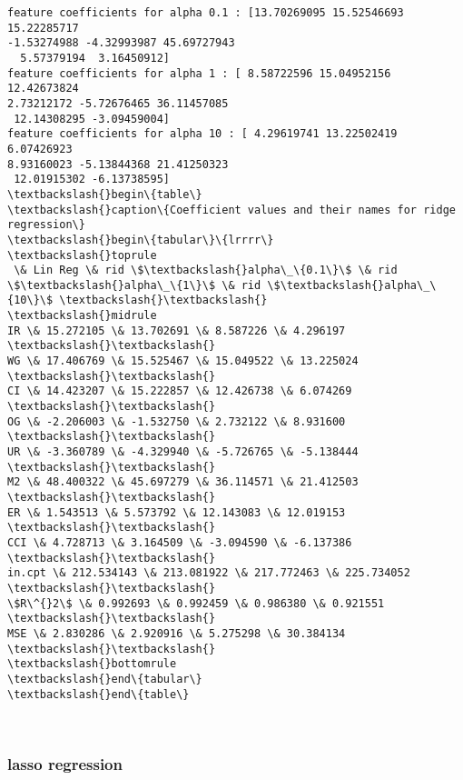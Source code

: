 \documentclass[11pt]{article}
\begin{document}
    \begin{Verbatim}[commandchars=\\\{\}]
feature coefficients for alpha 0.1 : [13.70269095 15.52546693 15.22285717
-1.53274988 -4.32993987 45.69727943
  5.57379194  3.16450912]
feature coefficients for alpha 1 : [ 8.58722596 15.04952156 12.42673824
2.73212172 -5.72676465 36.11457085
 12.14308295 -3.09459004]
feature coefficients for alpha 10 : [ 4.29619741 13.22502419  6.07426923
8.93160023 -5.13844368 21.41250323
 12.01915302 -6.13738595]
\textbackslash{}begin\{table\}
\textbackslash{}caption\{Coefficient values and their names for ridge regression\}
\textbackslash{}begin\{tabular\}\{lrrrr\}
\textbackslash{}toprule
 \& Lin Reg \& rid \$\textbackslash{}alpha\_\{0.1\}\$ \& rid \$\textbackslash{}alpha\_\{1\}\$ \& rid \$\textbackslash{}alpha\_\{10\}\$ \textbackslash{}\textbackslash{}
\textbackslash{}midrule
IR \& 15.272105 \& 13.702691 \& 8.587226 \& 4.296197 \textbackslash{}\textbackslash{}
WG \& 17.406769 \& 15.525467 \& 15.049522 \& 13.225024 \textbackslash{}\textbackslash{}
CI \& 14.423207 \& 15.222857 \& 12.426738 \& 6.074269 \textbackslash{}\textbackslash{}
OG \& -2.206003 \& -1.532750 \& 2.732122 \& 8.931600 \textbackslash{}\textbackslash{}
UR \& -3.360789 \& -4.329940 \& -5.726765 \& -5.138444 \textbackslash{}\textbackslash{}
M2 \& 48.400322 \& 45.697279 \& 36.114571 \& 21.412503 \textbackslash{}\textbackslash{}
ER \& 1.543513 \& 5.573792 \& 12.143083 \& 12.019153 \textbackslash{}\textbackslash{}
CCI \& 4.728713 \& 3.164509 \& -3.094590 \& -6.137386 \textbackslash{}\textbackslash{}
in.cpt \& 212.534143 \& 213.081922 \& 217.772463 \& 225.734052 \textbackslash{}\textbackslash{}
\$R\^{}2\$ \& 0.992693 \& 0.992459 \& 0.986380 \& 0.921551 \textbackslash{}\textbackslash{}
MSE \& 2.830286 \& 2.920916 \& 5.275298 \& 30.384134 \textbackslash{}\textbackslash{}
\textbackslash{}bottomrule
\textbackslash{}end\{tabular\}
\textbackslash{}end\{table\}

    \end{Verbatim}

    \begin{center}
    \end{center}
    { \hspace*{\fill} \\}
    
    \subsubsection{lasso regression}\label{lasso-regression}
\end{document}
